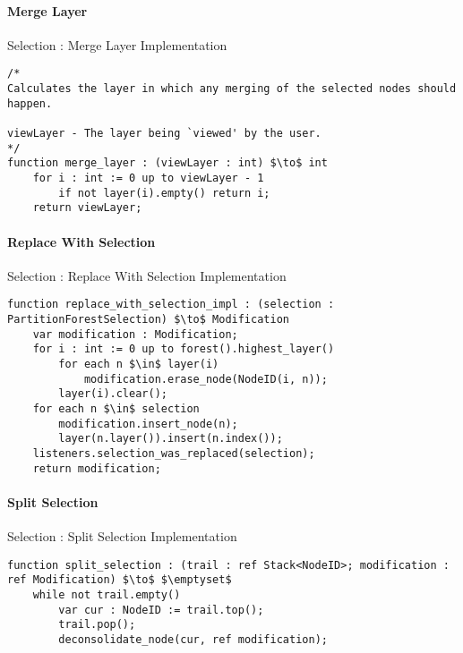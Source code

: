\paragraph{Merge Layer}

\begin{stulisting}[H]
\caption{Selection : Merge Layer Implementation}
\begin{lstlisting}[style=Default]
/*
Calculates the layer in which any merging of the selected nodes should happen.

viewLayer - The layer being `viewed' by the user.
*/
function merge_layer : (viewLayer : int) $\to$ int
	for i : int := 0 up to viewLayer - 1
		if not layer(i).empty() return i;
	return viewLayer;
\end{lstlisting}
\end{stulisting}

\paragraph{Replace With Selection}

\begin{stulisting}[H]
\caption{Selection : Replace With Selection Implementation}
\begin{lstlisting}[style=Default]
function replace_with_selection_impl : (selection : PartitionForestSelection) $\to$ Modification
	var modification : Modification;
	for i : int := 0 up to forest().highest_layer()
		for each n $\in$ layer(i)
			modification.erase_node(NodeID(i, n));
		layer(i).clear();
	for each n $\in$ selection
		modification.insert_node(n);
		layer(n.layer()).insert(n.index());
	listeners.selection_was_replaced(selection);
	return modification;
\end{lstlisting}
\end{stulisting}

\paragraph{Split Selection}

\begin{stulisting}[H]
\caption{Selection : Split Selection Implementation}
\begin{lstlisting}[style=Default]
function split_selection : (trail : ref Stack<NodeID>; modification : ref Modification) $\to$ $\emptyset$
	while not trail.empty()
		var cur : NodeID := trail.top();
		trail.pop();
		deconsolidate_node(cur, ref modification);
\end{lstlisting}
\end{stulisting}

